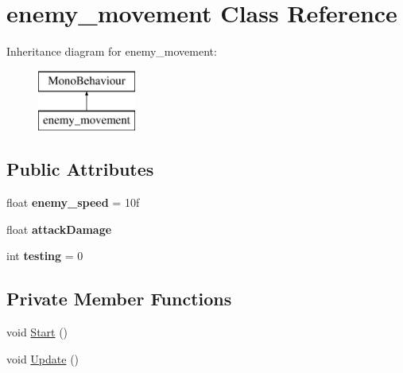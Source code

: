 \hypertarget{classenemy__movement}{}\section{enemy\+\_\+movement Class Reference}
\label{classenemy__movement}
Inheritance diagram for enemy\+\_\+movement\+:\begin{figure}[H]
\begin{center}
\leavevmode
\includegraphics[height=2.000000cm]{classenemy__movement}
\end{center}
\end{figure}
\subsection*{Public Attributes}
\begin{DoxyCompactItemize}
\item 
\mbox{\label{classenemy__movement_aaa269754d38c16dcce632cafebb2e370}} 
float {\bfseries enemy\+\_\+speed} = 10f
\item 
\mbox{\label{classenemy__movement_a45601a45a3c6ff8a8566fe3fe8924991}} 
float {\bfseries attack\+Damage}
\item 
\mbox{\label{classenemy__movement_ac5fd26c4fa810e357a52251b25f31805}} 
int {\bfseries testing} = 0
\end{DoxyCompactItemize}
\subsection*{Private Member Functions}
\begin{DoxyCompactItemize}
\item 
void \hyperlink{classenemy__movement_a6f78b4e6952786e1ee8d7063b4c59dba}{Start} ()
\item 
void \hyperlink{classenemy__movement_a6937591e8d99aec470f81199b0850967}{Update} ()
\end{DoxyCompactItemize}

